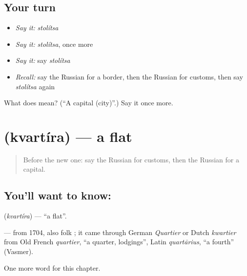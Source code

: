 \subsection*{Your turn}
\begin{itemize}
\raggedright
  \item \emph{Say it:} \emph{stolítsa}
  \item \emph{Say it:} \emph{stolítsa}, once more
  \item \emph{Say it:} say \emph{stolítsa}
  \item \emph{Recall:} say the Russian for a border, then the Russian for customs, then say \emph{stolítsa} again
\end{itemize}

\begin{tcolorbox}[breakable,colback=teal!4,colframe=teal!35!black,title={Before you move on}]
What does  mean? (\textquotedblleft{}A capital (city)\textquotedblright{}.) Say it once more.
\end{tcolorbox}
\section[\texorpdfstring{\ru{квартира} (kvartíra)}{квартира (kvartíra)}]{ (kvartíra) — a flat}

\label{lesson:RU-C213-kvartira}



\begin{quote}
Before the new one: say the Russian for customs, then the Russian for a capital.
\end{quote}

\subsection*{You'll want to know: }
\textbf{} (\emph{kvartíra}) — \textquotedblleft{}a flat\textquotedblright{}.

\begin{cousinweb}
\textbf{} — from 1704, also folk \emph{}; it came through German \emph{Quartier} or Dutch \emph{kwartier} from Old French \emph{quartier}, \textquotedblleft{}a quarter, lodgings\textquotedblright{}, Latin \emph{quartārius}, \textquotedblleft{}a fourth\textquotedblright{} (Vasmer).
\end{cousinweb}

\begin{grammarlens}[title={What you've built}]
One more word for this chapter.
\end{grammarlens}

